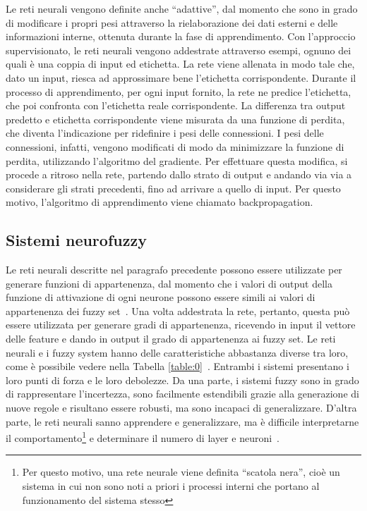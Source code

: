 \documentclass[11pt,  oneside, openany]{book}
\begin{document}
Le reti neurali vengono definite anche ``adattive'', dal momento che sono in grado di modificare i propri pesi attraverso la rielaborazione dei dati esterni e delle informazioni interne, ottenuta durante la fase di apprendimento. Con l'approccio supervisionato, le reti neurali vengono addestrate attraverso esempi, ognuno dei quali è una coppia di input ed etichetta. La rete viene allenata in modo tale che, dato un input, riesca ad approssimare bene l'etichetta corrispondente. Durante il processo di apprendimento, per ogni input fornito, la rete ne predice l'etichetta, che poi confronta con l'etichetta reale corrispondente. La differenza tra output predetto e etichetta corrispondente viene misurata da una funzione di perdita, che diventa l'indicazione per ridefinire i pesi delle connessioni. I pesi delle connessioni, infatti, vengono modificati di modo da minimizzare la funzione di perdita, utilizzando l'algoritmo del gradiente. Per effettuare questa modifica, si procede a ritroso nella rete, partendo dallo strato di output e andando via via a considerare gli strati precedenti, fino ad arrivare a quello di input. Per questo motivo, l'algoritmo di apprendimento viene chiamato backpropagation. 


\subsection{Sistemi neurofuzzy}
Le reti neurali descritte nel paragrafo precedente possono essere utilizzate per generare funzioni di appartenenza, dal momento che i valori di output della funzione di attivazione di ogni neurone possono essere simili ai valori di appartenenza dei fuzzy set~\cite{membneuralnetwsimilar}. Una volta addestrata la rete, pertanto, questa può essere utilizzata per generare gradi di appartenenza, ricevendo in input il vettore delle feature e dando in output il grado di appartenenza ai fuzzy set. Le reti neurali e i fuzzy system hanno delle caratteristiche abbastanza diverse tra loro, come è possibile vedere nella Tabella \ref{table:0}~\cite{neurofuzzyintro}. Entrambi i sistemi presentano i loro punti di forza e le loro debolezze. Da una parte, i sistemi fuzzy sono in grado di rappresentare l'incertezza, sono facilmente estendibili grazie alla generazione di nuove regole e risultano essere robusti, ma sono incapaci di generalizzare. D'altra parte, le reti neurali sanno apprendere e generalizzare, ma è difficile interpretarne il comportamento\footnote{Per questo motivo, una rete neurale viene definita ``scatola nera'', cioè un sistema in cui non sono noti a priori i processi interni che portano al funzionamento del sistema stesso} e determinare il numero di layer e neuroni~\cite{surveyneurofuzzy}.
\end{document}
